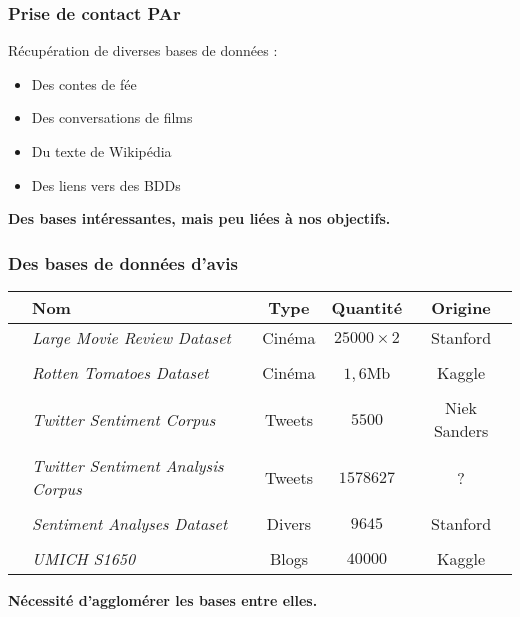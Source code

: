 \begin{frame}
	\frametitle{Prise de contact PAr}
	Récupération de diverses bases de données :
	\begin{itemize}
		\item Des contes de fée
		\item Des conversations de films
		\item Du texte de Wikipédia
		\item Des liens vers des BDDs
	\end{itemize}
	\begin{center}
		\textbf{Des bases intéressantes, mais peu liées à nos objectifs.}
	\end{center}
\end{frame}

\begin{frame}
	\frametitle{Des bases de données d'avis}
	\fontsize{9pt}{9pt}\selectfont
	\begin{table}[ht]
		\centering
		\begin{tabular}{cp{2.8cm}ccc}
			\toprule
			&\textbf{Nom} & \textbf{Type} & \textbf{Quantité} & \textbf{Origine} \\
			\midrule
			\textcolor{bordeau}{\faFilm} & \textit{Large Movie Review Dataset} & \textcolor{bordeau}{Cinéma} & $25 000\times2$ & Stanford \\
			&&& \\
			\textcolor{bordeau}{\faFilm} & \textit{Rotten Tomatoes Dataset} & \textcolor{bordeau}{Cinéma} & $1,6$Mb & Kaggle \\
			&&& \\
			\textcolor{bluenight}{\faTwitter} & \textit{Twitter Sentiment Corpus} & \textcolor{bluenight}{Tweets} & $5500$ & Niek Sanders \\
			&&& \\
			\textcolor{bluenight}{\faTwitter} & \textit{Twitter Sentiment Analysis Corpus} & \textcolor{bluenight}{Tweets} & $1 578 627$ & ? \\
			&&& \\
			\textcolor{vertforet}{\faCommentsO} & \textit{Sentiment Analyses Dataset} & \textcolor{vertforet}{Divers} & $9 645$ & Stanford \\
			&&& \\
			\textcolor{vertforet}{\faCommentsO} & \textit{UMICH S1650} & \textcolor{vertforet}{Blogs} & $40 000$ & Kaggle \\
			\bottomrule
		\end{tabular}
	\end{table}
	\begin{center}
		\textbf{Nécessité d'agglomérer les bases entre elles.}
	\end{center}
\end{frame}